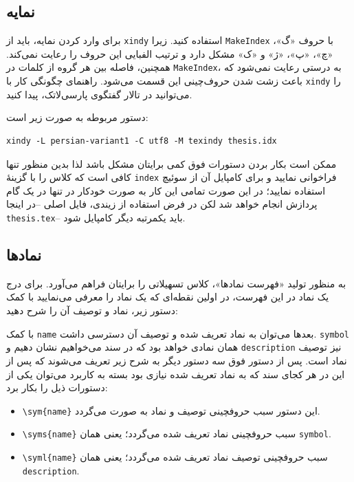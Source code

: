    \subsection{نمایه}
    برای وارد کردن نمایه، باید از 
    \Verb!xindy!
    استفاده کنید. زیرا 
    \Verb!MakeIndex!
    با حروف «گ»، «چ»، «پ»، «ژ» و «ک» مشکل دارد و ترتیب الفبایی این حروف را رعایت نمی‌کند. همچنین، فاصله بین هر گروه از کلمات در 
    \Verb!MakeIndex!،
    به درستی رعایت نمی‌شود که باعث زشت شدن حروف‌چینی این قسمت می‌شود. راهنمای چگونگی کار با 
    \Verb!xindy! 
    را می‌توانید در تالار گفتگوی پارسی‌لاتک، پیدا کنید.

    دستور مربوطه به صورت زیر است:

    \label{xindy}
    \begin{latin}
    \begin{Verbatim}
xindy -L persian-variant1 -C utf8 -M texindy thesis.idx
    \end{Verbatim}
    \end{latin}
    ممکن است بکار بردن دستورات فوق کمی برایتان مشکل باشد لذا بدین منظور تنها کافی است که کلاس را با گزینهٔ \Verb+index+ فراخوانی نمایید 
    و برای کامپایل آن از سوئیچ  استفاده نمایید؛ در این صورت تمامی این کار به صورت خودکار در تنها در یک گام پردازش 
    انجام خواهد شد لکن در فرض استفاده از زیندی،  فایل اصلی --در اینجا \Verb+thesis.tex+-- باید یکمرتبه دیگر کامپایل شود.
    
    \subsection{ نمادها}
    به منظور تولید «فهرست نمادها»، کلاس  تسهیلاتی را برایتان فراهم می‌آورد. 
    برای درج یک نماد در این فهرست،‌ در اولین نقطه‌ای که یک نماد را معرفی می‌نمایید با کمک دستور زیر، نماد و توصیف آن را شرح دهید:
    
    \hfill{}
    
    با کمک \Verb+name+ بعدها می‌توان به نماد تعریف شده و توصیف آن دسترسی داشت. \Verb+symbol+ 
    همان نمادی خواهد بود که در سند     می‌خواهیم نشان دهیم و \Verb+description+ نیز توصیف نماد است. 
    پس از دستور فوق سه دستور دیگر به شرح زیر تعریف می‌شوند که پس از این در هر کجای سند که به نماد تعریف شده نیازی بود بسته به 
    کاربرد می‌توان یکی از دستورات ذیل را بکار برد: 
    \begin{itemize}
        \item \Verb+\sym{name}+ این دستور سبب حروفچینی توصیف و نماد به صورت \linebreak
         می‌گردد. 
        \item \Verb+\syms{name}+ سبب حروفچینی نماد تعریف شده می‌گردد؛ یعنی همان  \Verb+symbol+. 
        \item \Verb+\syml{name}+ سبب حروفچینی توصیف نماد تعریف شده می‌گردد؛ یعنی همان \linebreak\Verb+description+. 
    \end{itemize}
    
